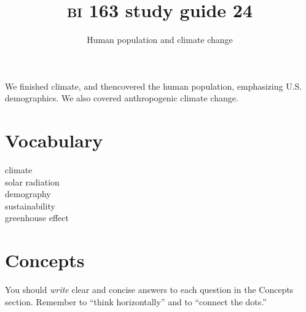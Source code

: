 \documentclass[letterpaper]{tufte-handout}
\title{{\scshape bi} 163 study guide 24}
\author{Human population and climate change }
\date{} %
\begin{document}
\maketitle	%

We finished climate, and thencovered the human population, emphasizing U.S. demographics. We also covered anthropogenic climate change.

\section*{Vocabulary}

\vspace{-1\baselineskip}
\begin{multicols}{2}
climate \\
solar radiation \\
demography \\
sustainability \\
greenhouse effect
\end{multicols}

\section*{Concepts}

You should \emph{write} clear and concise answers to each question in the Concepts section.  Remember to ``think horizontally'' and to ``connect the dots.'' 
\end{document}
